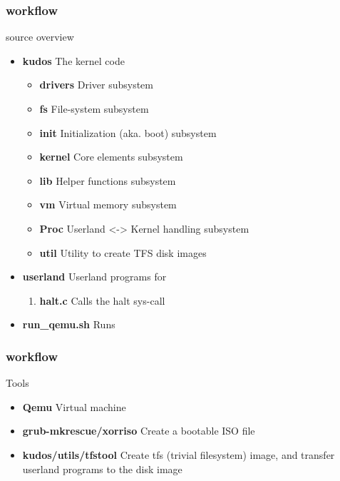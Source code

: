 \begin{frame}
    \frametitle{\kudos{} workflow}

    \begin{center}
        \kudos{} source overview
    \end{center}
    \vspace{\fill}

    \begin{itemize}
        \item \textbf{kudos} The \kudos{} kernel code
            \begin{itemize}
                \item \textbf{drivers} Driver subsystem
                \item \textbf{fs} File-system subsystem
                \item \textbf{init} Initialization (aka. boot) subsystem
                \item \textbf{kernel} Core elements subsystem
                \item \textbf{lib} Helper functions subsystem
                \item \textbf{vm} Virtual memory subsystem
                \item \textbf{Proc} Userland <-> Kernel handling subsystem
                \item \textbf{util} Utility to create TFS disk images
            \end{itemize}
        \item \textbf{userland} Userland programs for \kudos{}
            \begin{enumerate}
                \item \textbf{halt.c} Calls the halt sys-call
            \end{enumerate}
        \item \textbf{run\_qemu.sh} Runs \kudos{}
    \end{itemize}

    \vspace{\fill}
\end{frame}

\begin{frame}
    \frametitle{\kudos{} workflow}

    \begin{center}
        Tools
    \end{center}
    \vspace{\fill}

    \begin{itemize}
        \item \textbf{Qemu} Virtual machine
        \item \textbf{grub-mkrescue/xorriso} Create a bootable ISO file
        \item \textbf{kudos/utils/tfstool} Create tfs (trivial filesystem) image, and transfer userland programs to the disk image
    \end{itemize}
\end{frame}

